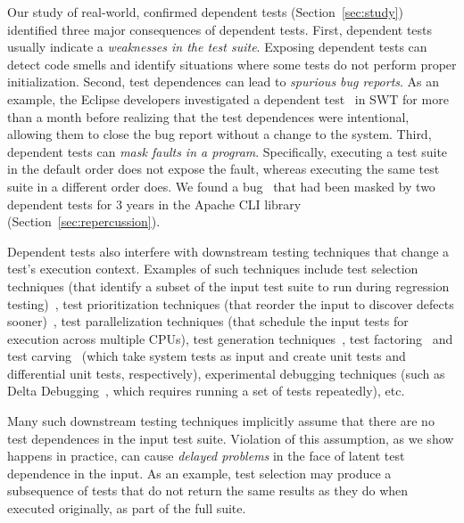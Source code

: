 Our study of \dtnum real-world, confirmed dependent
tests 
(Section~\ref{sec:study}) identified three
major consequences of dependent tests.
%
First, dependent tests usually indicate a
\emph{weaknesses in the test suite}. Exposing
dependent tests can detect code smells and identify situations
where some tests do not perform proper initialization.
%
Second, test dependences can lead
to \emph{spurious bug reports}. As an example, the Eclipse developers
investigated a dependent test~\cite{eclipsebug} in SWT for
more than a month before realizing that the test dependences were intentional,
allowing them to close the bug report without a change to the system.
%
Third, dependent tests can
\emph{mask faults in a program}. Specifically, executing a test suite in the
default order does not expose the fault, whereas
executing the same test suite in a different order does. We found 
a bug~\cite{clibug} that had been masked by two dependent tests
for 3 years in the Apache CLI library~\cite{cli} (Section~\ref{sec:repercussion}).


Dependent tests also interfere with downstream testing
techniques that change a test's execution context.
Examples of such techniques include
test selection techniques (that identify a subset of
the input test suite to run during
regression testing)~\cite{harroldetal:OOPSLA:2001},
test prioritization techniques (that reorder the
input to discover defects sooner)~\cite{Elbaum:2000:PTC:347324.348910},
test parallelization techniques (that schedule the input tests for execution across multiple
CPUs), test generation techniques~\cite{PachecoLET2007, SPLAT},
test factoring~\cite{Saff:2005} and test carving~\cite{Elbaum:2006} (which take system tests as
input and create unit tests and differential unit tests,
respectively), experimental debugging techniques (such as Delta Debugging~\cite{Zeller:2002},
which requires running a set of tests repeatedly), etc. 

Many such downstream testing techniques implicitly assume that
there are no test dependences in the input test suite.  Violation of
this assumption, as we show happens in practice, can cause \emph{delayed problems} in the face
of latent test dependence in the input.  As an
example, test selection may produce a subsequence of tests that do not
return the same results as they do when executed originally, as part of the full suite.


